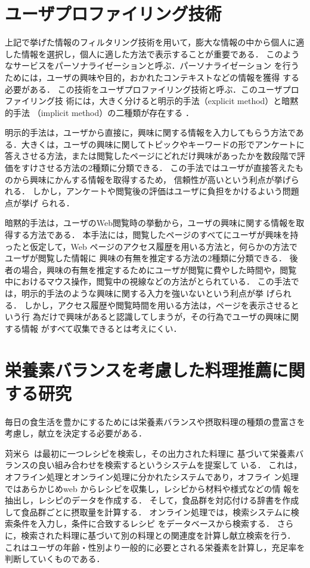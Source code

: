 \documentclass[11pt,titlepage,uplatex]{ujreport}
\begin{document}
\section{ユーザプロファイリング技術}
上記で挙げた情報のフィルタリング技術を用いて，膨大な情報の中から個人に適
した情報を選択し，個人に適した方法で表示することが重要である．
このようなサービスをパーソナライゼーションと呼ぶ．パーソナライゼーション
を行うためには，ユーザの興味や目的，おかれたコンテキストなどの情報を獲得
する必要がある．
この技術をユーザプロファイリング技術と呼ぶ．このユーザプロファイリング技
術には，大きく分けると明示的手法（explicit method）と暗黙的手法
（implicit method）の二種類が存在する \cite{hijikata04}．

明示的手法は，ユーザから直接に，興味に関する情報を入力してもらう方法であ
る．大きくは，ユーザの興味に関してトピックやキーワードの形でアンケートに
答えさせる方法，または閲覧したページにどれだけ興味があったかを数段階で評
価をすけさせる方法の2種類に分類できる．
この手法ではユーザが直接答えたものから興味にかんする情報を取得するため，
信頼性が高いという利点が挙げられる．
しかし，アンケートや閲覧後の評価はユーザに負担をかけるよいう問題点が挙げ
られる．

暗黙的手法は，ユーザのWeb閲覧時の挙動から，ユーザの興味に関する情報を取
得する方法である．
本手法には，閲覧したページのすべてにユーザが興味を持ったと仮定して，Web
ページのアクセス履歴を用いる方法と，何らかの方法でユーザが閲覧した情報に
興味の有無を推定する方法の2種類に分類できる．
後者の場合，興味の有無を推定するためにユーザが閲覧に費やした時間や，閲覧
中におけるマウス操作，閲覧中の視線などの方法がとられている．
この手法では，明示的手法のような興味に関する入力を強いないという利点が挙
げられる．
しかし，アクセス履歴や閲覧時間を用いる方法は，ページを表示させるという行
為だけで興味があると認識してしまうが，その行為でユーザの興味に関する情報
がすべて収集できるとは考えにくい．

\section{栄養素バランスを考慮した料理推薦に関する研究}
毎日の食生活を豊かにするためには栄養素バランスや摂取料理の種類の豊富さを
考慮し，献立を決定する必要がある．

苅米ら~\cite{karikome09}は最初に一つレシピを検索し，その出力された料理に
基づいて栄養素バランスの良い組み合わせを検索するというシステムを提案して
いる．
これは，オフライン処理とオンライン処理に分かれたシステムであり，オフライ
ン処理ではあらかじめweb からレシピを収集し，レシピから材料や様式などの情
報を抽出し，レシピのデータを作成する．
そして，食品群を対応付ける辞書を作成して食品群ごとに摂取量を計算する．
オンライン処理では，検索システムに検索条件を入力し，条件に合致するレシピ
をデータベースから検索する．
さらに，検索された料理に基づいて別の料理との関連度を計算し献立検索を行う．
これはユーザの年齢・性別より一般的に必要とされる栄養素を計算し，充足率を
判断していくものである．
\end{document}
